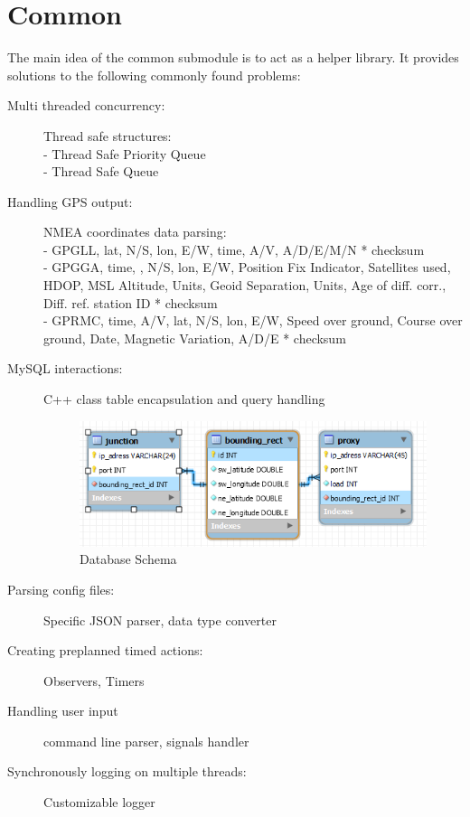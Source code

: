 \documentclass[17pt]{report}
\begin{document}
\section{Common}
\indent \indent
The main idea of the common submodule is to act as a helper library. It provides 
solutions to the following commonly found problems:
\begin{description}
    \item[Multi threaded concurrency:] Thread safe structures:\\
    - Thread Safe Priority Queue\\
    - Thread Safe Queue
    \item[Handling GPS output:] NMEA coordinates data parsing: \\
    - GPGLL, lat, N/S, lon, E/W, time, A/V, A/D/E/M/N * checksum\\
    - GPGGA, time, , N/S, lon, E/W, Position Fix Indicator, Satellites used, HDOP, MSL Altitude, Units, 
	Geoid Separation, Units, Age of diff. corr., Diff. ref. station ID * checksum\\
    - GPRMC, time, A/V, lat, N/S, lon, E/W, Speed over ground,
    Course over ground, Date, Magnetic Variation, A/D/E * checksum
    \item[MySQL interactions:] C++ class table encapsulation and query handling
    \begin{figure}[h!]
        \includegraphics[width=\textwidth]{DB/DbSchema.png}
        \caption{Database Schema}
        \label{fig:Database Schema}
    \end{figure}
    \item[Parsing config files:] Specific JSON parser, data type converter
    \item[Creating preplanned timed actions:] Observers, Timers 
    \item[Handling user input] command line parser, signals handler
    \item[Synchronously logging on multiple threads:] Customizable logger
\end{description}
\end{document}
